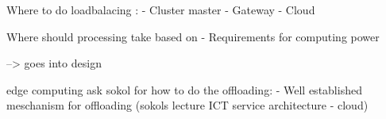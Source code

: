 Where to do loadbalacing :
 - Cluster master
 - Gateway
 - Cloud

 Where should processing take based on
  - Requirements for computing power

--> goes into design

edge computing ask sokol for how to do the offloading:
 - Well established meschanism for offloading (sokols lecture ICT service architecture - cloud)